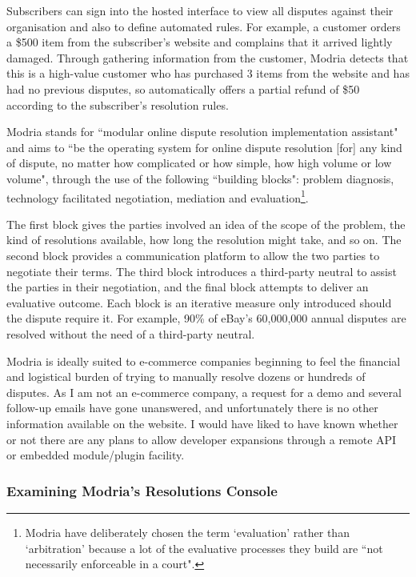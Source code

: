 Subscribers can sign into the hosted interface to view all disputes against their organisation and also to define automated rules. For example, a customer orders a \$500 item from the subscriber's website and complains that it arrived lightly damaged. Through gathering information from the customer, Modria detects that this is a high-value customer who has purchased 3 items from the website and has had no previous disputes, so automatically offers a partial refund of \$50 according to the subscriber's resolution rules.

Modria stands for ``modular online dispute resolution implementation assistant" and aims to ``be the operating system for online dispute resolution [for] any kind of dispute, no matter how complicated or how simple, how high volume or low volume",\cite{modria:interview} through the use of the following ``building blocks": problem diagnosis, technology facilitated negotiation, mediation and evaluation\footnote{Modria have deliberately chosen the term `evaluation' rather than `arbitration' because a lot of the evaluative processes they build are ``not necessarily enforceable in a court".}.

The first block gives the parties involved an idea of the scope of the problem, the kind of resolutions available, how long the resolution might take, and so on. The second block provides a communication platform to allow the two parties to negotiate their terms. The third block introduces a third-party neutral to assist the parties in their negotiation, and the final block attempts to deliver an evaluative outcome. Each block is an iterative measure only introduced should the dispute require it. For example, 90\% of eBay's 60,000,000 annual disputes are resolved without the need of a third-party neutral.

Modria is ideally suited to e-commerce companies beginning to feel the financial and logistical burden of trying to manually resolve dozens or hundreds of disputes. As I am not an e-commerce company, a request for a demo and several follow-up emails have gone unanswered, and unfortunately there is no other information available on the website. I would have liked to have known whether or not there are any plans to allow developer expansions through a remote API or embedded module/plugin facility.

\subsubsection{Examining Modria's Resolutions Console}

